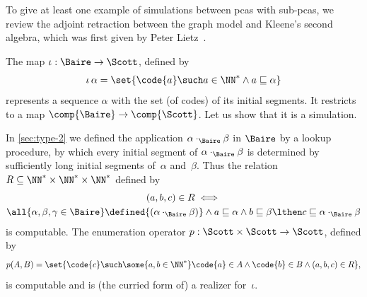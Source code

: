 %
%

To give at least one example of simulations between pcas with sub-pcas, we review the adjoint retraction between the graph model and Kleene's second algebra, which was first given by Peter Lietz~\cite{Lietz:04}.

The map $\iota: \Baire \to \Scott$, defined by
\begin{equation*}
  \iota \, \alpha =
  \set{ \code{a} \such
    a \in \NN^{*} \land a \sqsubseteq \alpha
    }
\end{equation*}
%
represents a sequence $\alpha$ with the set (of codes) of its initial segments. It restricts to a map $\comp{\Baire} \to \comp{\Scott}$. Let us show that it is a simulation.

In \cref{sec:type-2}  we defined the application $\alpha \cdot_{\Baire} \beta$ in $\Baire$ by a lookup procedure, by which every initial segment of $\alpha \cdot_{\Baire} \beta$ is determined by sufficiently long initial segments of~$\alpha$ and~$\beta$. Thus the relation $R \subseteq \NN^{*} \times \NN^{*} \times \NN^{*}$ defined by
%
\begin{multline*}
  (a, b, c) \in R \iff \\
  \all{\alpha, \beta, \gamma \in \Baire}
  \defined{(\alpha \cdot_{\Baire} \beta)} \land
  a \sqsubseteq \alpha \land
  b \sqsubseteq \beta
  \lthen
  c \sqsubseteq \alpha \cdot_{\Baire} \beta
\end{multline*}
%
is computable. The enumeration operator $p : \Scott \times \Scott \to \Scott$, defined by
% 
\begin{equation*}
  p (A, B) =
  \set{ \code{c} \such
        \some{a, b \in \NN^{*}}
          \code{a} \in A \land \code{b} \in B \land (a, b, c) \in R },
\end{equation*}
% 
is computable and is (the curried form of) a realizer for~$\iota$.

